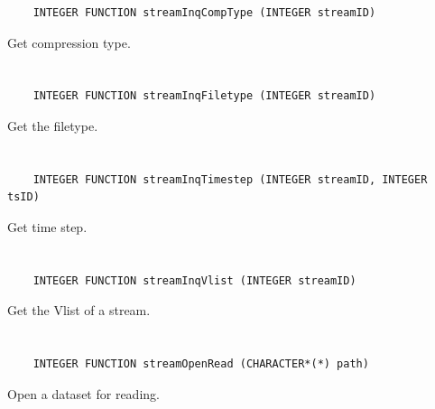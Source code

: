 \begin{verbatim}
    INTEGER FUNCTION streamInqCompType (INTEGER streamID)
\end{verbatim}

Get compression type.


\section*{\tt {}}

\begin{verbatim}
    INTEGER FUNCTION streamInqFiletype (INTEGER streamID)
\end{verbatim}

Get the filetype.


\section*{\tt {}}

\begin{verbatim}
    INTEGER FUNCTION streamInqTimestep (INTEGER streamID, INTEGER tsID)
\end{verbatim}

Get time step.


\section*{\tt {}}

\begin{verbatim}
    INTEGER FUNCTION streamInqVlist (INTEGER streamID)
\end{verbatim}

Get the Vlist of a stream.


\section*{\tt {}}

\begin{verbatim}
    INTEGER FUNCTION streamOpenRead (CHARACTER*(*) path)
\end{verbatim}

Open a dataset for reading.


\section*{\tt {}}

